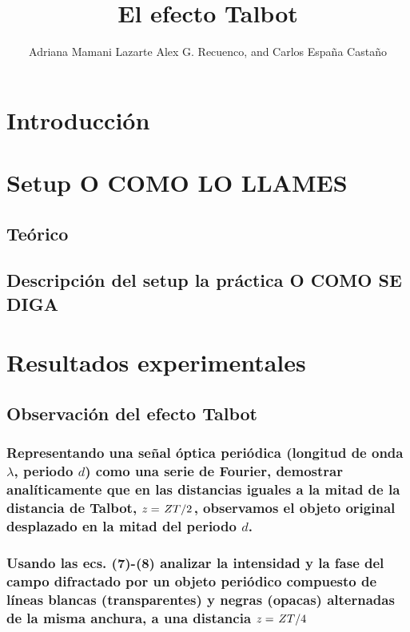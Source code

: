 \documentclass{./packages/optica-article}
\begin{document}
\title{El efecto Talbot}

\author{Adriana Mamani Lazarte Alex G. Recuenco, and Carlos España Castaño}

\address{Universidad Complutense de Madrid, Madrid, PC 28040, España}

\section{Introducción}

\section{Setup O COMO LO LLAMES}

\subsection{Teórico}

\subsection{Descripción del setup la práctica O COMO SE DIGA}

\section{Resultados experimentales}

\subsection{Observación del efecto Talbot}

\subsubsection{Representando una señal óptica periódica (longitud de onda $\lambda$, periodo $d$) como una serie de Fourier,
	demostrar analíticamente que en las distancias iguales a la mitad de la distancia de Talbot,
	$z=\flatfrac{ZT}{2}$, observamos el objeto original desplazado en la mitad del periodo $d$.
}
\subsubsection{Usando las ecs. (7)-(8) analizar la intensidad y la fase del campo difractado por un objeto periódico compuesto de líneas blancas (transparentes) y negras (opacas) alternadas de la misma anchura, a una distancia $z=\flatfrac{ZT}{4}$}
\end{document}

